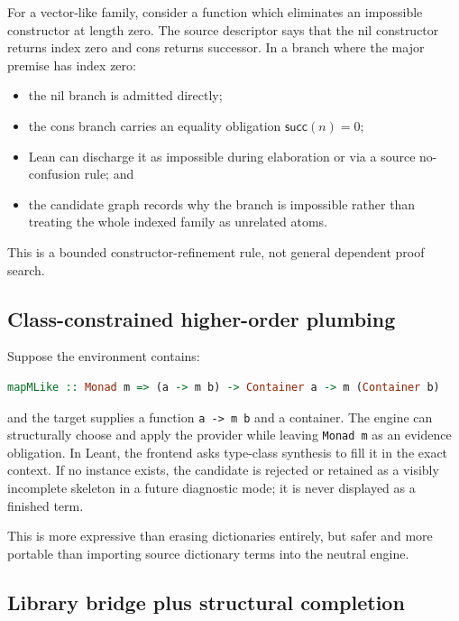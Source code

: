 \documentclass[11pt]{article}
\newcommand{\code}[1]{\texttt{#1}}
\newcommand{\Leant}{\textsf{Leant}}
\begin{document}
For a vector-like family, consider a function which eliminates an impossible
constructor at length zero.  The source descriptor says that the nil
constructor returns index zero and cons returns successor.  In a branch where
the major premise has index zero:

\begin{itemize}
  \item the nil branch is admitted directly;
  \item the cons branch carries an equality obligation
    \(\mathsf{succ}(n)=0\);
  \item Lean can discharge it as impossible during elaboration or via a source
    no-confusion rule; and
  \item the candidate graph records why the branch is impossible rather than
    treating the whole indexed family as unrelated atoms.
\end{itemize}

This is a bounded constructor-refinement rule, not general dependent proof
search.

\subsection{Class-constrained higher-order plumbing}

Suppose the environment contains:

\begin{lstlisting}[language=Haskell]
mapMLike :: Monad m => (a -> m b) -> Container a -> m (Container b)
\end{lstlisting}

and the target supplies a function \code{a -> m b} and a container.  The engine
can structurally choose and apply the provider while leaving \code{Monad m} as
an evidence obligation.  In \Leant{}, the frontend asks type-class synthesis to
fill it in the exact context.  If no instance exists, the candidate is rejected
or retained as a visibly incomplete skeleton in a future diagnostic mode; it
is never displayed as a finished term.

This is more expressive than erasing dictionaries entirely, but safer and more
portable than importing source dictionary terms into the neutral engine.

\subsection{Library bridge plus structural completion}
\end{document}
